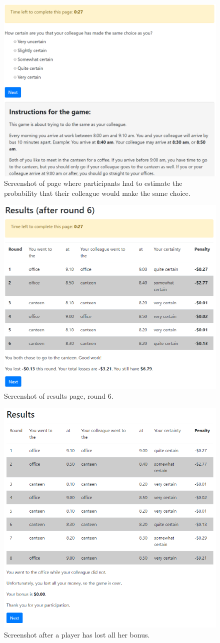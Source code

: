 \documentclass[a4paper,superscriptaddress,nofootinbib]{revtex4}
\begin{document}
\begin{figure} %
\centering\includegraphics[width=0.8\linewidth]{screenshot_certainty}
\caption{Screenshot of page where participants had to estimate the probability that their colleague would make the same choice.}
\label{fig:certainty}
\end{figure}
\begin{figure} %
\centering\includegraphics[width=0.7\linewidth]{screenshot_round6results}
\caption{Screenshot of results page, round 6.}
\label{fig:results6}
\end{figure}
\begin{figure} %
\centering\includegraphics[width=0.7\linewidth]{screenshot_round8finished}
\caption{Screenshot after a player has lost all her bonus.}
\label{fig:round8finished}
\end{figure}
\end{document}
